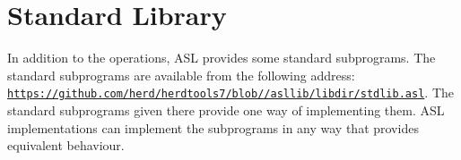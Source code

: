 \chapter{Standard Library\label{chap:StandardLibrary}}

In addition to the operations, ASL provides some standard subprograms.
The standard subprograms are available from the following address:
\href{https://github.com/herd/herdtools7/blob/\VERSION/asllib/libdir/stdlib.asl}{\texttt{https://github.com/herd/herdtools7/blob/\VERSION/asllib/libdir/stdlib.asl}}.
%
The standard subprograms given there provide one way of implementing them.
ASL implementations can implement the subprograms in any way that provides equivalent behaviour.
